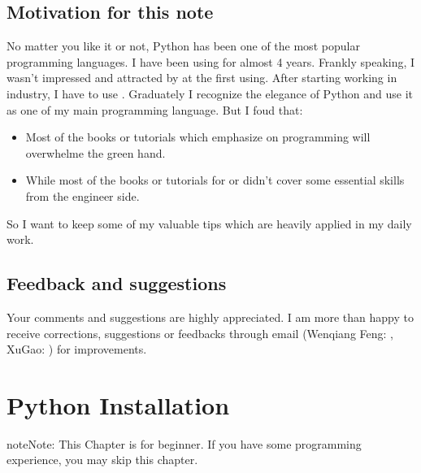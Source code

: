 \documentclass[letterpaper,12pt,english]{sphinxmanual}
\begin{document}
\section{Motivation for this note}
\label{\detokenize{preface:motivation-for-this-note}}
No matter you like it or not, Python has been one of the most popular programming languages.
I have been using  for almost 4 years. Frankly speaking, I wasn’t impressed and attracted
by  at the first using. After starting working in industry, I have to use . Graduately
I recognize the elegance of Python and use it as one of my main programming language. But I foud that:
\begin{itemize}
\item {} 
Most of the  books or tutorials which emphasize on programming will overwhelme the green hand.

\item {} 
While most of the  books or tutorials for  or  didn’t cover some essential skills from the engineer side.

\end{itemize}

So I want to keep some of my valuable tips which are heavily applied in my daily work.


\section{Feedback and suggestions}
\label{\detokenize{preface:feedback-and-suggestions}}
Your comments and suggestions are highly appreciated. I am more than happy to receive
corrections, suggestions or feedbacks through email (Wenqiang Feng: , XuGao: ) for improvements.


\chapter{Python Installation}
\label{\detokenize{install:python-installation}}\label{\detokenize{install:install}}\label{\detokenize{install::doc}}
\begin{sphinxadmonition}{note}{Note:}
This Chapter {\hyperref[\detokenize{install:install}]{}} is for beginner.  If you have some  programming experience, you may skip this chapter.
\end{sphinxadmonition}
\end{document}
